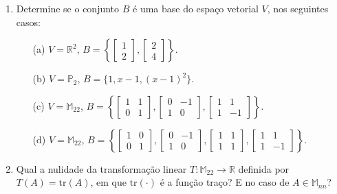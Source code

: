 \documentclass[a4paper,12pt]{article}
\begin{document}
\begin{enumerate}
\item Determine se o conjunto $B$ é uma base do espaço vetorial $V$, nos seguintes casos:
\begin{enumerate}
    \item[(a)] $V = \mathbb{R}^2$, $B = \left\{ \begin{bmatrix} 1 \\ 2 \end{bmatrix}, \begin{bmatrix} 2 \\ 4 \end{bmatrix} \right\}$.
    \item[(b)] $V = \mathbb{P}_2$, $B = \{1, x - 1, (x - 1)^2\}$.
    \item[(c)] $V = \mathbb{M}_{22}$, $B = \left\{ \begin{bmatrix} 1 & 1 \\ 0 & 1 \end{bmatrix}, \begin{bmatrix} 0 & -1 \\ 1 & 0 \end{bmatrix}, \begin{bmatrix} 1 & 1 \\ 1 & -1 \end{bmatrix}\right\}$.
    \item[(d)] $V = \mathbb{M}_{22}$, $B = \left\{ \begin{bmatrix} 1 & 0 \\ 0 & 1 \end{bmatrix}, \begin{bmatrix} 0 & -1 \\ 1 & 0 \end{bmatrix}, \begin{bmatrix} 1 & 1 \\ 1 & 1 \end{bmatrix}, \begin{bmatrix} 1 & 1 \\ 1 & -1 \end{bmatrix}\right\}$.
\end{enumerate}

\item Qual a nulidade da transformação linear $T: \mathbb{M}_{22} \to \mathbb{R}$ definida por $T(A) = \text{tr}(A)$, em que $\text{tr}(\cdot)$ é a função traço? E no caso de $A \in \mathbb{M}_{nn}$?


\end{enumerate}
\end{document}
